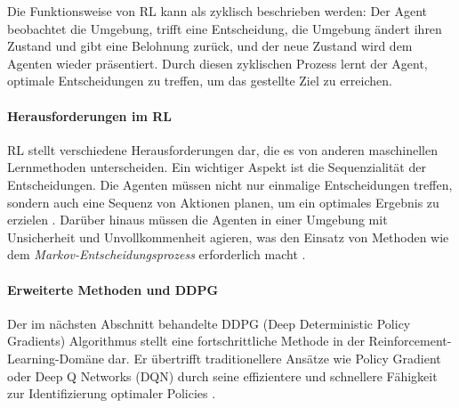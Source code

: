 Die Funktionsweise von RL kann als zyklisch beschrieben werden: Der Agent beobachtet die Umgebung, trifft eine Entscheidung, die Umgebung ändert ihren Zustand und gibt eine Belohnung zurück, und der neue Zustand wird dem Agenten wieder präsentiert. Durch diesen zyklischen Prozess lernt der Agent, optimale Entscheidungen zu treffen, um das gestellte Ziel zu erreichen.

\paragraph{Herausforderungen im RL}

RL stellt verschiedene Herausforderungen dar, die es von anderen maschinellen Lernmethoden unterscheiden. Ein wichtiger Aspekt ist die Sequenzialität der Entscheidungen. Die Agenten müssen nicht nur einmalige Entscheidungen treffen, sondern auch eine Sequenz von Aktionen planen, um ein optimales Ergebnis zu erzielen \cite{morales2020grokking}. Darüber hinaus müssen die Agenten in einer Umgebung mit Unsicherheit und Unvollkommenheit agieren, was den Einsatz von Methoden wie dem \textit{Markov-Entscheidungsprozess} erforderlich macht \cite{brunton2019data}.

\paragraph{Erweiterte Methoden und DDPG}

Der im nächsten Abschnitt behandelte DDPG (Deep Deterministic Policy Gradients) Algorithmus stellt eine fortschrittliche Methode in der Reinforcement-Learning-Domäne dar. Er übertrifft traditionellere Ansätze wie Policy Gradient oder Deep Q Networks (DQN) durch seine effizientere und schnellere Fähigkeit zur Identifizierung optimaler Policies \cite{morales2020grokking}.

